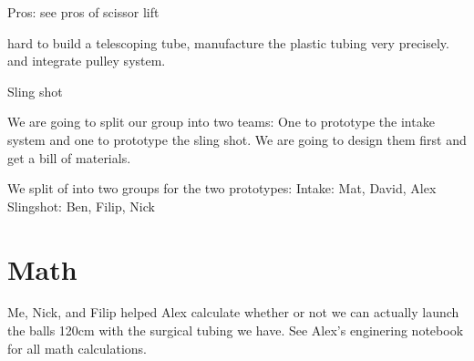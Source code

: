 Pros: see pros of scissor lift

hard to build a telescoping tube, manufacture the plastic tubing very precisely. and integrate pulley system.

 Sling shot

We are going to split our group into two teams: One to prototype the intake system and one to prototype the sling shot. We are going to design them first and get a bill of materials. 

We split of into two groups for the two prototypes: 
Intake: Mat, David, Alex
Slingshot: Ben, Filip, Nick 

\section*{Math}
Me, Nick, and Filip helped Alex calculate whether or not we can actually launch the balls 120cm with the surgical tubing we have. See Alex's enginering notebook for all math calculations. 